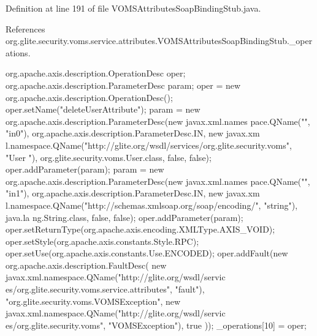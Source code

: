 Definition at line 191 of file VOMSAttributesSoapBindingStub.java.



References org.glite.security.voms.service.attributes.VOMSAttributesSoapBindingStub.\_\-operations.


\begin{DoxyCode}
                                             {
        org.apache.axis.description.OperationDesc oper;
        org.apache.axis.description.ParameterDesc param;
        oper = new org.apache.axis.description.OperationDesc();
        oper.setName("deleteUserAttribute");
        param = new org.apache.axis.description.ParameterDesc(new javax.xml.names
      pace.QName("", "in0"), org.apache.axis.description.ParameterDesc.IN, new javax.xm
      l.namespace.QName("http://glite.org/wsdl/services/org.glite.security.voms", "User
      "), org.glite.security.voms.User.class, false, false);
        oper.addParameter(param);
        param = new org.apache.axis.description.ParameterDesc(new javax.xml.names
      pace.QName("", "in1"), org.apache.axis.description.ParameterDesc.IN, new javax.xm
      l.namespace.QName("http://schemas.xmlsoap.org/soap/encoding/", "string"), java.la
      ng.String.class, false, false);
        oper.addParameter(param);
        oper.setReturnType(org.apache.axis.encoding.XMLType.AXIS_VOID);
        oper.setStyle(org.apache.axis.constants.Style.RPC);
        oper.setUse(org.apache.axis.constants.Use.ENCODED);
        oper.addFault(new org.apache.axis.description.FaultDesc(
                      new javax.xml.namespace.QName("http://glite.org/wsdl/servic
      es/org.glite.security.voms.service.attributes", "fault"),
                      "org.glite.security.voms.VOMSException",
                      new javax.xml.namespace.QName("http://glite.org/wsdl/servic
      es/org.glite.security.voms", "VOMSException"), 
                      true
                     ));
        _operations[10] = oper;

}
\end{DoxyCode}
